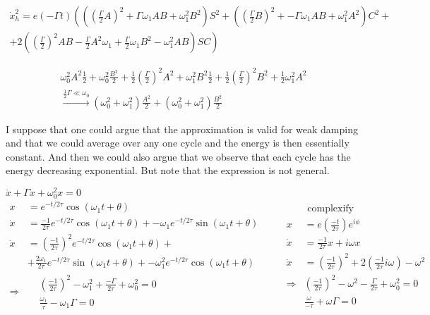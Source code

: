 \documentclass[twoside,10pt]{amsart}
\newcommand{\problemhead}[1]
  {\smallskip
   \noindent{\large\bf Problem #1.}
   \smallskip}
\begin{document}
\begin{multline*}
  \dot{x}_h^2  = e(-\Gamma t)\left( \left( \left( \frac{\Gamma}{2} A \right)^2 + \Gamma \omega_1 AB + \omega_1^2 B^2 \right) S^2 + \left( \left( \frac{\Gamma}{2} B \right)^2 + - \Gamma \omega_1 AB + \omega_1^2 A^2 \right)C^2   + \right. \\
  + \left. 2 \left( \left( \frac{\Gamma}{2} \right)^2 AB - \frac{\Gamma}{2} A^2 \omega_1 + \frac{\Gamma}{2} \omega_1 B^2 - \omega_1^2 AB \right) SC \right)
\end{multline*}

\[
\begin{gathered}
  \omega_0^2 A^2 \frac{1}{2} + \omega_0^2 \frac{B^2}{2} + \frac{1}{2} \left( \frac{ \Gamma}{2} \right)^2 A^2 + \omega_1^2 B^2 \frac{1}{2} + \frac{1}{2} \left( \frac{\Gamma}{2} \right)^2 B^2 + \frac{1}{2} \omega_1^2 A^2 \\
  \xrightarrow{\frac{1}{2} \Gamma \ll \omega_0 } (\omega_0^2 + \omega_1^2) \frac{A^2}{2} + (\omega_0^2 + \omega_1^2) \frac{B^2}{2} 
\end{gathered}
\]

I suppose that one could argue that the approximation is valid for weak damping and that we could average over any one cycle and the energy is then essentially constant.  And then we could also argue that we observe that each cycle has the energy decreasing exponential.  But note that the expression is not general.  

\problemhead{3.2} $  \ddot{x} + \Gamma \dot{x} + \omega_0^2 x = 0 $
\[
\begin{aligned}
  x & = e^{-t/2\tau} \cos{ ( \omega_1 t + \theta ) } \\
  \dot{x} & = \frac{-1}{2\tau } e^{-t/2\tau } \cos{(\omega_1 t + \theta) } + -\omega_1 e^{-t/2\tau} \sin{ (\omega_1 t + \theta) } \\
  \ddot{x} & = \left( \frac{-1}{2 \tau} \right)^2 e^{-t/2\tau } \cos{ (\omega_1 t + \theta) } + \\
  & + \frac{ 2 \omega_1 }{ 2 \tau } e^{-t/2\tau } \sin{ (\omega_1 t + \theta) } + -\omega_1^2 e^{-t/2\tau } \cos{ (\omega_1 t + \theta) } \\
\Longrightarrow & \begin{aligned}
& \left( \frac{-1}{2\tau} \right)^2 - \omega_1^2 + \frac{ -\Gamma }{2 \tau} + \omega_0^2 = 0 \\
  & \frac{ \omega_1}{ \tau } - \omega_1 \Gamma = 0 
\end{aligned} 
\end{aligned}
\quad \quad 
\begin{aligned}
  & \text{ complexify } \\
  x & = e\left( \frac{ -t}{2 \tau } \right) e^{i\phi } \\
  \dot{x} & = \frac{ -1}{ 2 \tau } x + i \omega x \\
  \ddot{x} & = \left( \frac{-1}{2 \tau} \right)^2 + 2 \left( \frac{-1}{2 \tau} i \omega \right) - \omega^2 \\
  \Longrightarrow & \left( \frac{-1}{2 \tau } \right)^2 - \omega^2 - \frac{ \Gamma }{ 2 \tau } + \omega_0^2 = 0 \\
  & \frac{ \omega}{ -\tau } + \omega \Gamma = 0 
\end{aligned}
\]
\end{document}
